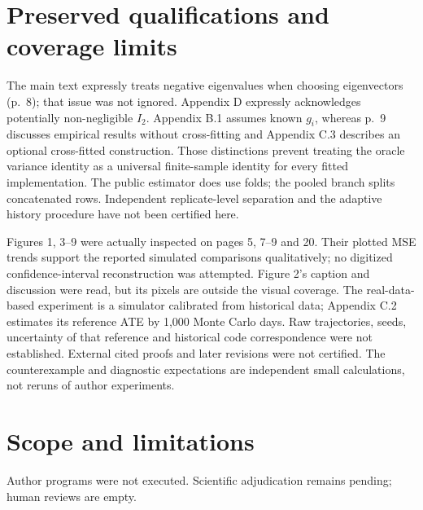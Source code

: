 \documentclass[10pt]{article}
\begin{document}
\section*{Preserved qualifications and coverage limits}
The main text expressly treats negative eigenvalues when choosing eigenvectors (p. 8); that issue was not ignored. Appendix D expressly acknowledges potentially non-negligible \(I_2\). Appendix B.1 assumes known \(g_i\), whereas p. 9 discusses empirical results without cross-fitting and Appendix C.3 describes an optional cross-fitted construction. Those distinctions prevent treating the oracle variance identity as a universal finite-sample identity for every fitted implementation. The public estimator does use folds; the pooled branch splits concatenated rows. Independent replicate-level separation and the adaptive history procedure have not been certified here.\par
Figures 1, 3–9 were actually inspected on pages 5, 7–9 and 20. Their plotted MSE trends support the reported simulated comparisons qualitatively; no digitized confidence-interval reconstruction was attempted. Figure 2’s caption and discussion were read, but its pixels are outside the visual coverage. The real-data-based experiment is a simulator calibrated from historical data; Appendix C.2 estimates its reference ATE by 1,000 Monte Carlo days. Raw trajectories, seeds, uncertainty of that reference and historical code correspondence were not established. External cited proofs and later revisions were not certified. The counterexample and diagnostic expectations are independent small calculations, not reruns of author experiments.\par
\section*{Scope and limitations}
Author programs were not executed. Scientific adjudication remains pending; human reviews are empty.\par
\end{document}
